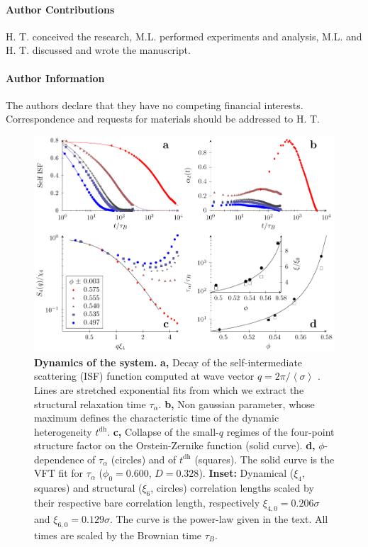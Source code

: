 \paragraph*{\bf Author Contributions}
H. T. conceived the research, M.L. performed experiments and analysis, M.L. and H. T. discussed and wrote the manuscript.

\paragraph*{\bf Author Information} 
The authors declare that they have no competing financial interests. 
Correspondence and requests for materials should be addressed to 
H. T. 

\clearpage

\begin{figure}
\begin{center}
\includegraphics{fig_vft.pdf}
\end{center}
\caption{\textbf{Dynamics of the system.} 
	\textbf{a,} Decay of the self-intermediate scattering (ISF) function computed at wave vector $q=2\pi/\left\langle \sigma\right\rangle$ . Lines are stretched exponential fits from which we extract the structural relaxation time $\tau_\alpha$. 
	\textbf{b,} Non gaussian parameter, whose maximum defines the characteristic time of the dynamic heterogeneity $t^\text{dh}$.
	\textbf{c,} Collapse of the small-$q$ regimes of the four-point structure factor on the Orstein-Zernike function (solid curve).
	\textbf{d,} $\phi$-dependence of $\tau_\alpha$ (circles) and of $t^\text{dh}$ (squares). The solid curve is the VFT fit for $\tau_\alpha$ ($\phi_0=0.600$, $D=0.328$). 
	\textbf{Inset:} Dynamical ($\xi_4$, squares) and structural ($\xi_6$, circles) correlation lengths  scaled by their respective bare correlation length, respectively $\xi_{4,0}=0.206\sigma$ and $\xi_{6,0}=0.129\sigma$. The curve is the power-law given in the text.
	All times are scaled by the Brownian time $\tau_B$.}
	\label{fig:vft}
\end{figure}

